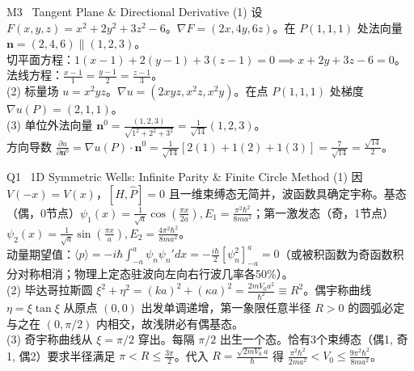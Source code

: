 \documentclass[a4paper,11pt]{article}
\begin{document}
\vspace{1.5pt}

\begin{solution}{M3 \textperiodcentered\ Tangent Plane \& Directional Derivative}
(1) 设 $F(x,y,z) = x^2+2y^2+3z^2-6$。$\nabla F = (2x, 4y, 6z)$。在 $P(1,1,1)$ 处法向量 $\mathbf{n} = (2, 4, 6) \parallel (1, 2, 3)$。\\
切平面方程：$1(x-1) + 2(y-1) + 3(z-1) = 0 \implies x + 2y + 3z - 6 = 0$。法线方程：$\frac{x-1}{1} = \frac{y-1}{2} = \frac{z-1}{3}$。\\
(2) 标量场 $u = x^2yz$。$\nabla u = (2xyz, x^2z, x^2y)$。在点 $P(1,1,1)$ 处梯度 $\nabla u(P) = (2, 1, 1)$。\\
(3) 单位外法向量 $\mathbf{n}^0 = \frac{(1, 2, 3)}{\sqrt{1^2+2^2+3^2}} = \frac{1}{\sqrt{14}}(1, 2, 3)$。\\
方向导数 $\frac{\partial u}{\partial \mathbf{n}^0} = \nabla u(P) \cdot \mathbf{n}^0 = \frac{1}{\sqrt{14}}[2(1) + 1(2) + 1(3)] = \frac{7}{\sqrt{14}} = \frac{\sqrt{14}}{2}$。
\end{solution}

\vspace{1.5pt}

\begin{solution}{Q1 \textperiodcentered\ 1D Symmetric Wells: Infinite Parity \& Finite Circle Method}
(1) 因 $V(-x)=V(x)$，$[H,\hat{P}]=0$ 且一维束缚态无简并，波函数具确定宇称。基态（偶，0节点）$\psi_1(x) = \frac{1}{\sqrt{a}}\cos(\frac{\pi x}{2a}), E_1 = \frac{\pi^2\hbar^2}{8ma^2}$；第一激发态（奇，1节点）$\psi_2(x) = \frac{1}{\sqrt{a}}\sin(\frac{\pi x}{a}), E_2 = \frac{4\pi^2\hbar^2}{8ma^2}$。\\
动量期望值：$\langle p \rangle = -i\hbar\int_{-a}^a \psi_n \psi_n' dx = -\frac{i\hbar}{2}[\psi_n^2]_{-a}^a = 0$（或被积函数为奇函数积分对称相消；物理上定态驻波向左向右行波几率各50\%）。\\
(2) 毕达哥拉斯圆 $\xi^2+\eta^2 = (ka)^2+(\kappa a)^2 = \frac{2mV_0a^2}{\hbar^2} \equiv R^2$。偶宇称曲线 $\eta = \xi\tan\xi$ 从原点 $(0,0)$ 出发单调递增，第一象限任意半径 $R>0$ 的圆弧必定与之在 $(0, \pi/2)$ 内相交，故浅阱必有偶基态。\\
(3) 奇宇称曲线从 $\xi=\pi/2$ 穿出。每隔 $\pi/2$ 出生一个态。恰有3个束缚态（偶1, 奇1, 偶2）要求半径满足 $\pi < R \le \frac{3\pi}{2}$。代入 $R = \frac{\sqrt{2mV_0}a}{\hbar}$ 得 $\frac{\pi^2\hbar^2}{2ma^2} < V_0 \le \frac{9\pi^2\hbar^2}{8ma^2}$。
\end{solution}

\vspace{1.5pt}
\end{document}

